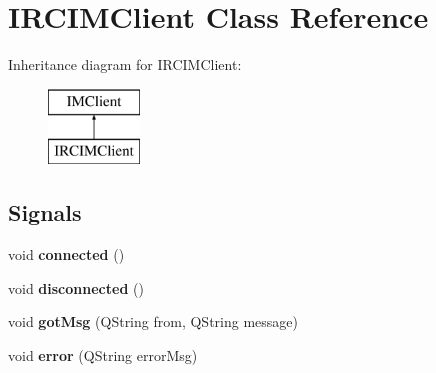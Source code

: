 \hypertarget{classIRCIMClient}{
\section{IRCIMClient Class Reference}
\label{classIRCIMClient}
}
Inheritance diagram for IRCIMClient:\begin{figure}[H]
\begin{center}
\leavevmode
\includegraphics[height=2cm]{classIRCIMClient}
\end{center}
\end{figure}
\subsection*{Signals}
\begin{DoxyCompactItemize}
\item 
\hypertarget{classIRCIMClient_a727c2876a18e56ae354bbdf97d7680ed}{
void {\bfseries connected} ()}
\label{classIRCIMClient_a727c2876a18e56ae354bbdf97d7680ed}

\item 
\hypertarget{classIRCIMClient_a0ccbc2d9556b490b74be7d4b54a94448}{
void {\bfseries disconnected} ()}
\label{classIRCIMClient_a0ccbc2d9556b490b74be7d4b54a94448}

\item 
\hypertarget{classIRCIMClient_a6d5ebb2b5acc008cabcb94fb100e0b60}{
void {\bfseries gotMsg} (QString from, QString message)}
\label{classIRCIMClient_a6d5ebb2b5acc008cabcb94fb100e0b60}

\item 
\hypertarget{classIRCIMClient_a5e87342f449aa6d428318efdb4eb300f}{
void {\bfseries error} (QString errorMsg)}
\label{classIRCIMClient_a5e87342f449aa6d428318efdb4eb300f}

\end{DoxyCompactItemize}
